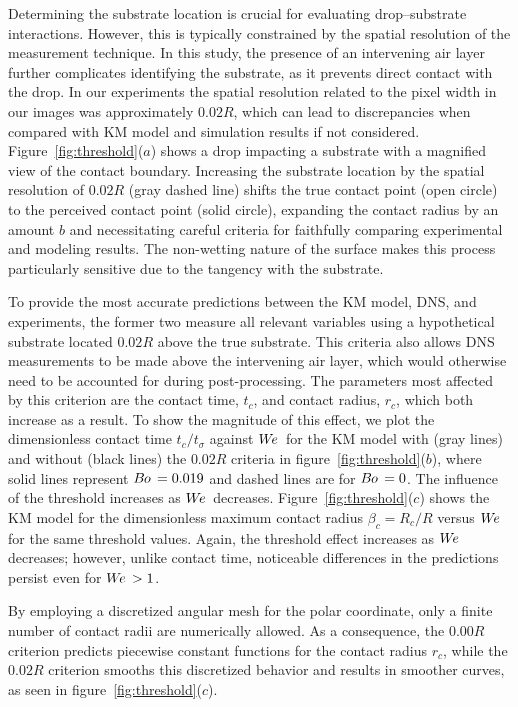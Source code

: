 \documentclass{jfm}
\newcommand{\We}{W\kern-0.15em e\,}
\newcommand{\Bo}{B\kern-0.05em o\,}
\begin{document}
Determining the substrate location is crucial for evaluating drop–substrate interactions. However, this is typically constrained by the spatial resolution of the measurement technique. In this study, the presence of an intervening air layer further complicates identifying the substrate, as it prevents direct contact with the drop. In our experiments the spatial resolution related to the pixel width in our images was approximately $0.02R$, which can lead to discrepancies when compared with KM model and simulation results if not considered. Figure~\ref{fig:threshold}($a$) shows a drop impacting a substrate with a magnified view of the contact boundary. Increasing the substrate location by the spatial resolution of $0.02R$ (gray dashed line) shifts the true contact point (open circle) to the perceived contact point (solid circle), expanding the contact radius by an amount $b$ and necessitating careful criteria for faithfully comparing experimental and modeling results.  The non-wetting nature of the surface makes this process particularly sensitive due to the tangency with the substrate.

To provide the most accurate predictions between the KM model, DNS, and experiments, the former two measure all relevant variables using  a hypothetical substrate located $0.02R$ above the true substrate. This criteria also allows DNS measurements to be made above the intervening air layer, which would otherwise need to be accounted for during post-processing. The parameters most affected by this criterion are the contact time, $t_c$, and contact radius, $r_c$, which both increase as a result. To show the magnitude of this effect, we plot the dimensionless contact time $t_c / t_{\sigma}$ against $\We$ for the KM model with (gray lines) and without (black lines) the $0.02R$ criteria in figure~\ref{fig:threshold}($b$), where solid lines represent $\Bo = 0.019$ and dashed lines are for $\Bo = 0$. The influence of the threshold increases as $\We$ decreases. Figure~\ref{fig:threshold}($c$) shows the KM model for the dimensionless maximum contact radius $\beta_{c} = R_{c} / R$ versus $\We$ for the same threshold values. Again, the threshold effect increases as $\We$ decreases; however, unlike contact time, noticeable differences in the predictions persist even for $\We>1$. 

By employing a discretized angular mesh for the polar coordinate, only a finite number of contact radii are numerically allowed. As a consequence, the $0.00R$ criterion predicts piecewise constant functions for the contact radius $r_c$, while the $0.02R$ criterion smooths this discretized behavior and results in smoother curves, as seen in figure~\ref{fig:threshold}($c$). 
\end{document}
